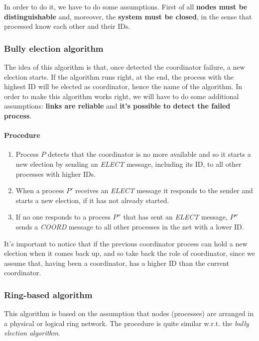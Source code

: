 In order to do it, we have to do some assumptions. First of all \textbf{nodes must be distinguishable} and, moreover, the \textbf{system must be closed}, in the sense that processed know each other and their IDs.


\subsubsection{Bully election algorithm}
The idea of this algorithm is that, once detected the coordinator failure, a new election starts. If the algorithm runs right, at the end, the process with the highest ID will be elected as coordinator, hence the name of the algorithm. In order to make this algorithm works right, we will have to do some additional assumptions: \textbf{links are reliable} and \textbf{it's possible to detect the failed process}.

\paragraph{Procedure}
\begin{enumerate}
    \item Process $P$ detects that the coordinator is no more available and so it starts a new election by sending an \textit{ELECT} message, including its ID, to all other processes with higher IDs.
    \item When a process $P'$ receives an \textit{ELECT} message it responds to the sender and starts a new election, if it has not already started.
    \item If no one responds to a process $P''$ that has sent an \textit{ELECT} message, $P''$ sends a \textit{COORD} message to all other processes in the net with a lower ID.
\end{enumerate}

It's important to notice that if the previous coordinator process can hold a new election when it comes back up, and so take back the role of coordinator, since we assume that, having been a coordinator, has a higher ID than the current coordinator.

\subsubsection{Ring-based algorithm}
This algorithm is based on the assumption that nodes (processes) are arranged in a physical or logical ring network. The procedure is quite similar w.r.t. the \textit{bully election algorithm}.

